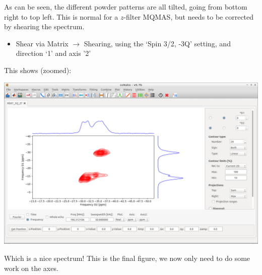 \documentclass[11pt,a4paper]{article}
\begin{document}
As can be seen, the different powder patterns are all tilted, going from bottom right to top left.
This is normal for a $z$-filter MQMAS, but needs to be corrected by shearing the spectrum.
\begin{itemize}
	\item Shear via Matrix $\longrightarrow$ Shearing, using the `Spin 3/2, -3Q' setting, and
	  direction `1' and axis '2'
\end{itemize}
This shows (zoomed):
\begin{center}
\includegraphics[width=0.8\linewidth]{Figs/Fig7.png}
\end{center}
Which is a nice spectrum! This is the final figure, we now only need to do some work on the axes.
\end{document}
